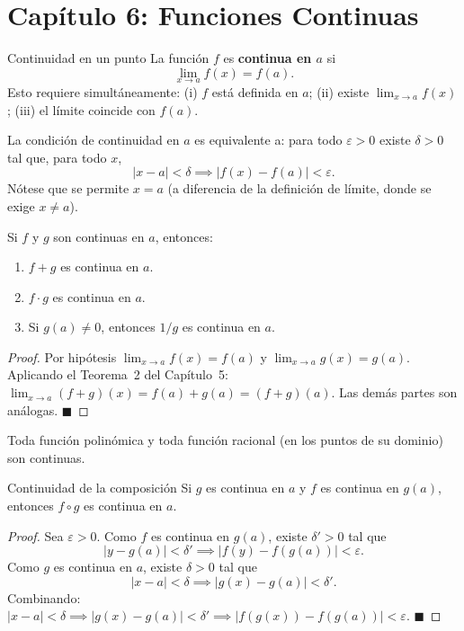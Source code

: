 \documentclass[12pt]{article}
\begin{document}
\section{Capítulo 6: Funciones Continuas}

\begin{definicion}[]{Continuidad en un punto}
La función $f$ es \textbf{continua en $a$} si
\[ \lim_{x \to a} f(x) = f(a). \]
Esto requiere simultáneamente: (i) $f$ está definida en $a$; (ii) existe $\lim_{x\to a}f(x)$; (iii) el límite coincide con $f(a)$.
\end{definicion}

\begin{nota}[]{}
La condición de continuidad en $a$ es equivalente a: para todo $\varepsilon > 0$ existe $\delta > 0$ tal que, para todo $x$,
\[ |x - a| < \delta \implies |f(x) - f(a)| < \varepsilon. \]
Nótese que se permite $x = a$ (a diferencia de la definición de límite, donde se exige $x \neq a$).
\end{nota}

\begin{teorema}[1]{}
Si $f$ y $g$ son continuas en $a$, entonces:
\begin{enumerate}
  \item[(1)] $f + g$ es continua en $a$.
  \item[(2)] $f \cdot g$ es continua en $a$.
  \item[(3)] Si $g(a) \neq 0$, entonces $1/g$ es continua en $a$.
\end{enumerate}
\end{teorema}

\begin{proof}
Por hipótesis $\lim_{x\to a}f(x) = f(a)$ y $\lim_{x\to a}g(x) = g(a)$. Aplicando el Teorema~2 del Capítulo~5:
$\lim_{x\to a}(f+g)(x) = f(a)+g(a) = (f+g)(a)$. Las demás partes son análogas.
$\blacksquare$
\end{proof}

\begin{corolario}[]{}
Toda función polinómica y toda función racional (en los puntos de su dominio) son continuas.
\end{corolario}

\begin{teorema}[2]{Continuidad de la composición}
Si $g$ es continua en $a$ y $f$ es continua en $g(a)$, entonces $f \circ g$ es continua en $a$.
\end{teorema}

\begin{proof}
Sea $\varepsilon > 0$. Como $f$ es continua en $g(a)$, existe $\delta' > 0$ tal que
\[ |y - g(a)| < \delta' \implies |f(y) - f(g(a))| < \varepsilon. \]
Como $g$ es continua en $a$, existe $\delta > 0$ tal que
\[ |x - a| < \delta \implies |g(x) - g(a)| < \delta'. \]
Combinando: $|x-a| < \delta \implies |g(x)-g(a)| < \delta' \implies |f(g(x)) - f(g(a))| < \varepsilon$.
$\blacksquare$
\end{proof}
\end{document}

